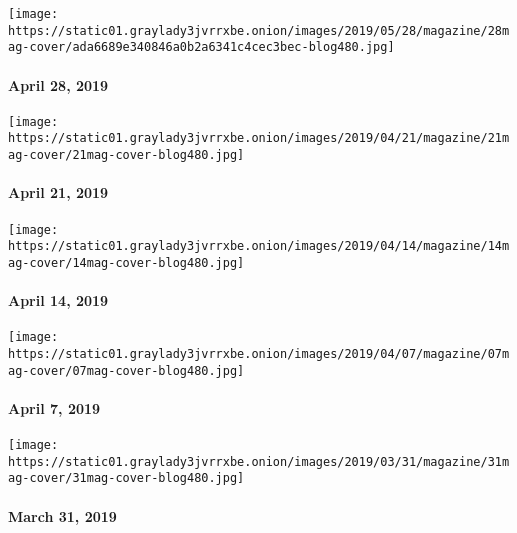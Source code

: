 \href{https://www.nytimes3xbfgragh.onion/issue/magazine/2019/05/17/the-42819-issue}{}

\texttt{[image: https://static01.graylady3jvrrxbe.onion/images/2019/05/28/magazine/28mag-cover/ada6689e340846a0b2a6341c4cec3bec-blog480.jpg]}

\hypertarget{april-28-2019}{%
\paragraph{April 28, 2019}\label{april-28-2019}}

\href{https://www.nytimes3xbfgragh.onion/issue/magazine/2019/04/23/the-42119-issue}{}

\texttt{[image: https://static01.graylady3jvrrxbe.onion/images/2019/04/21/magazine/21mag-cover/21mag-cover-blog480.jpg]}

\hypertarget{april-21-2019}{%
\paragraph{April 21, 2019}\label{april-21-2019}}

\href{https://www.nytimes3xbfgragh.onion/issue/magazine/2019/04/12/the-41419-issue}{}

\texttt{[image: https://static01.graylady3jvrrxbe.onion/images/2019/04/14/magazine/14mag-cover/14mag-cover-blog480.jpg]}

\hypertarget{april-14-2019}{%
\paragraph{April 14, 2019}\label{april-14-2019}}

\href{https://www.nytimes3xbfgragh.onion/issue/magazine/2019/04/06/the-4719-issue}{}

\texttt{[image: https://static01.graylady3jvrrxbe.onion/images/2019/04/07/magazine/07mag-cover/07mag-cover-blog480.jpg]}

\hypertarget{april-7-2019}{%
\paragraph{April 7, 2019}\label{april-7-2019}}

\href{https://www.nytimes3xbfgragh.onion/issue/magazine/2019/03/29/the-33119-issue}{}

\texttt{[image: https://static01.graylady3jvrrxbe.onion/images/2019/03/31/magazine/31mag-cover/31mag-cover-blog480.jpg]}

\hypertarget{march-31-2019}{%
\paragraph{March 31, 2019}\label{march-31-2019}}

